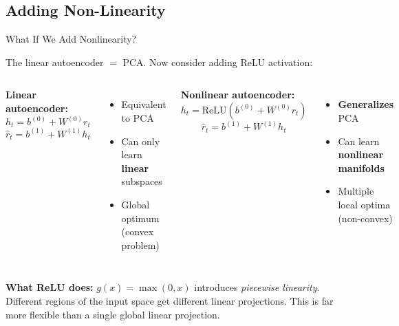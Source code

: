 \documentclass[aspectratio=169]{beamer}
\begin{document}
\subsection{Adding Non-Linearity}
%
\begin{frame}{What If We Add Nonlinearity?}

The linear autoencoder $=$ PCA. Now consider adding ReLU activation:

\vspace{0.5em}
\begin{columns}[T]
\textbf{Linear autoencoder:}
\[
h_t = b^{(0)} + W^{(0)} r_t
\]
\[
\hat{r}_t = b^{(1)} + W^{(1)} h_t
\]
\begin{itemize}
    \item Equivalent to PCA
    \item Can only learn \textbf{linear} subspaces
    \item Global optimum (convex problem)
\end{itemize}

\textbf{Nonlinear autoencoder:}
\[
h_t = \text{ReLU}\!\left(b^{(0)} + W^{(0)} r_t\right)
\]
\[
\hat{r}_t = b^{(1)} + W^{(1)} h_t
\]
\begin{itemize}
    \item \textbf{Generalizes} PCA
    \item Can learn \textbf{nonlinear manifolds}
    \item Multiple local optima (non-convex)
\end{itemize}
\end{columns}

\vspace{0.7em}
\textbf{What ReLU does:} $g(x) = \max(0, x)$ introduces \emph{piecewise linearity}. Different regions of the input space get different linear projections. This is far more flexible than a single global linear projection.
\end{frame}
%
%
\end{document}
